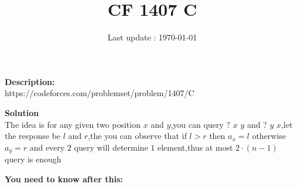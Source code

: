 \documentclass{article}
\begin{document}
\title{\textbf{CF 1407 C}}
\author{}
\date{Last update : \today}

\maketitle

\noindent \textbf{Description:}\\
https://codeforces.com/problemset/problem/1407/C

\noindent \textbf{Solution}\\
The idea is for any given two position $x$ and $y$,you can query ? $x$ $y$ and ? $y$ $x$,let the response be $l$ and $r$,the you can observe that if $l>r$ then $a_x=l$ otherwise $a_y=r$ and every $2$ query will determine $1$ element,thus at most $2\cdot (n-1)$ query is enough

\noindent \textbf{You need to know after this:}\\
\end{document}
